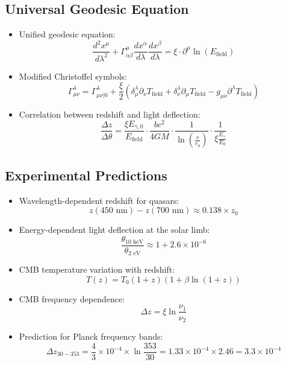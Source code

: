 \documentclass[12pt,a4paper]{article}
\begin{document}
	\subsection{Universal Geodesic Equation}
	\begin{itemize}
		\item Unified geodesic equation:
		$$\boxed{\frac{d^2 x^\mu}{d\lambda^2} + \Gamma^\mu_{\alpha\beta}\frac{dx^\alpha}{d\lambda}\frac{dx^\beta}{d\lambda} = \xi \cdot \partial^\mu \ln(E_{\text{field}})}$$
		
		\item Modified Christoffel symbols:
		$$\Gamma^\lambda_{\mu\nu} = \Gamma^\lambda_{\mu\nu|0} + \frac{\xi}{2} \left(\delta^\lambda_\mu \partial_\nu T_{\text{field}} + \delta^\lambda_\nu \partial_\mu T_{\text{field}} - g_{\mu\nu} \partial^\lambda T_{\text{field}}\right)$$
		
		\item Correlation between redshift and light deflection:
		$$\frac{\Delta z}{\Delta \theta} = \frac{\xi E_{\gamma,0}}{E_{\text{field}}} \cdot \frac{bc^2}{4GM} \cdot \frac{1}{\ln\left(\frac{r}{r_0}\right)} \cdot \frac{1}{\xi \frac{E_\gamma}{E_0}}$$
	\end{itemize}
	
	\subsection{Experimental Predictions}
\begin{itemize}
	\item Wavelength-dependent redshift for quasars:
	$$z(450\text{ nm}) - z(700\text{ nm}) \approx 0.138 \times z_0$$
	
	\item Energy-dependent light deflection at the solar limb:
	$$\frac{\theta_{10\text{ keV}}}{\theta_{2\text{ eV}}} \approx 1 + 2.6 \times 10^{-6}$$
	
	\item CMB temperature variation with redshift:
	$$T(z) = T_0(1+z)\left(1 + \beta \ln(1+z)\right)$$
	
	\item CMB frequency dependence:
	$$\Delta z = \xi \ln\frac{\nu_1}{\nu_2}$$
	
	\item Prediction for Planck frequency bands:
	$$\Delta z_{30-353} = \frac{4}{3} \times 10^{-4} \times \ln\frac{353}{30} = 1.33 \times 10^{-4} \times 2.46 = 3.3 \times 10^{-4}$$
\end{itemize}
\end{document}

